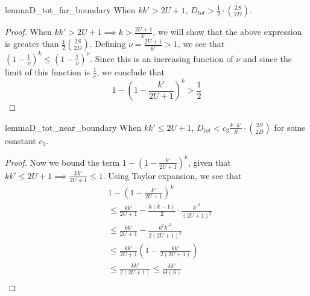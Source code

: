 
\begin{restatable}{lemma}{D_tot_far_boundary}
\label{lem:D_tot_far_boundary}
When $kk' > 2U + 1$, $D_{tot} > \frac 12\cdot \binom{2S}{2D}$.
\end{restatable}
\begin{proof}
When $kk' > 2U + 1 \implies k > \frac{2U+1}{k'}$,
we will show that the above expression is greater than $\frac 12 \binom{2S}{2D}$.
Defining $\nu = \frac{2U+1}{k'} > 1$, we see that $(1-\frac 1\nu)^k \le (1-\frac 1\nu)^\nu$.
Since this is an increasing function of $\nu$ and since the limit of this function is $\frac 1e$,
we conclude that
\[
1-\left(1 - \frac{k'}{2U+1}\right)^k > \frac 12
\]
\end{proof}

\begin{restatable}{lemma}{D_tot_near_boundary}
\label{lem:D_tot_near_boundary}
When $kk' \le 2U + 1$, $D_{tot} < c_3 \frac{k\cdot k'}{S}\cdot{{2S}\choose{2D}}$ for some constant $c_3$.
\end{restatable}
\begin{proof}
Now we bound the term $1-\left(1-\frac{k'}{2U+1}\right)^k$, given that $kk'\le 2U+1\implies\frac{kk'}{2U+1} \le 1$.
Using Taylor expansion, we see that
\begin{align}
&1 - \left(1 - \frac{k'}{2U+1}\right)^k\\
&\le \frac{kk'}{2U+1} - \frac{k(k-1)}{2}\cdot\frac{k'^2}{(2U+1)^2}\\
&\le \frac{kk'}{2U+1} - \frac{k^2k'^2}{2(2U+1)^2}\\
&\le \frac{kk'}{2U+1} \left(1 - \frac{kk'}{2(2U+1)}\right)\\
&\le \frac{kk'}{2(2U+1)} \le \frac{kk'}{\Theta(S)}\\
\end{align}
\end{proof}
